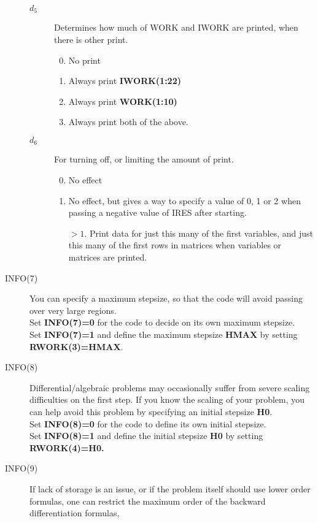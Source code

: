 \documentclass[twoside]{MATH77}
\begin{document}
\begin{description}
\begin{description}
\begin{enumerate}
    \end{enumerate}
  \item[$d_5$] Determines how much of WORK and IWORK are printed, when there
    is other print.
    \begin{enumerate}\setcounter{enumi}{-1}
    \item No print
    \item Always print \textbf{IWORK(1:22)}
    \item Always print \textbf{WORK(1:10)}
    \item Always print both of the above.
    \end{enumerate}
  \item[$d_6$] For turning off, or limiting the amount of print.
    \begin{enumerate}\setcounter{enumi}{-1}
    \item No effect
    \item No effect, but gives a way to specify a value of 0, 1 or 2 when passing
      a negative value of IRES after starting.
    \item[$> 1.$] Print data for just this many of the first variables, and
      just this many of the first rows in matrices when variables or matrices
      are printed.
    \end{enumerate}
  \end{description}
\item[INFO(7)] \label{info7} You can specify a maximum stepsize, so
  that the code
  will avoid passing over very large regions.\\
  Set \textbf{INFO(7)=0 }for the code to decide on its own maximum
  stepsize.\\
  Set \textbf{INFO(7)=1} and define the maximum stepsize \textbf{HMAX}
  by setting \textbf{RWORK(3)=HMAX}.
\item[INFO(8)] \label{info8}  Differential/algebraic problems may occasionally suffer from
  severe scaling difficulties on the first step. If you know the scaling of
  your problem, you can help avoid this problem by specifying an initial
  stepsize \textbf{H0}.\\
  Set \textbf{INFO(8)=0} for the code to
  define its own initial stepsize.\\
  Set \textbf{INFO(8)=1} and define the initial stepsize \textbf{H0} by
  setting \textbf{RWORK(4)=H0.}
\item[INFO(9)] \label{info9} If lack of storage is an issue, or if the
  problem itself should use lower order formulas, one can restrict the
  maximum order of the backward differentiation formulas,

\end{description}
\end{document}
